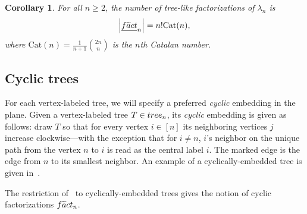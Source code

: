 \documentclass[a4paper,10pt,leqno]{amsart}
\newcommand{\darkred}{\color{darkred}}
\numberwithin{equation}{section}
\newtheorem{theorem}{Theorem}[section]
\newtheorem{corollary}[theorem]{Corollary}
\theoremstyle{definition}
\theoremstyle{remark}
\newcommand{\T}{\textsc{tree}}
\newcommand{\Ft}{\textsc{f}\widetilde{\textsc{a}}\textsc{ct}}
\newcommand{\E}{\T}
\newcommand{\EFt}{\underline{\Ft}}
\newcommand{\rrT}{\rr^T}
\newcommand{\rr}{\mathsf{r}}
\newcommand{\Trr}{T^\rr}
\newcommand{\Cat}{\mathrm{Cat}}
\newcommand{\defn}[1]{\emph{\darkred #1}}
\begin{document}
{
\renewcommand{\thecorollary}{\ref{cor:tree_like_enumeration}}
\begin{corollary}
For all $n\geq 2$, the number of tree-like factorizations of $\lambda_n$ is
\[\left|\EFt_n\right| = n! \Cat(n),\] where $\Cat(n) = \frac{1}{n+1}\binom{2n}{n}$ is the $n$th \defn{Catalan number}.
\end{corollary}
\addtocounter{theorem}{-1}
}


\subsection{Cyclic trees}

For each vertex-labeled tree, we will specify a preferred \emph{cyclic} embedding in the plane.  
Given a vertex-labeled tree $T \in \T_n$, its \defn{cyclic} embedding is given as follows: draw $T$ so that for every vertex $i \in [n]$ its neighboring vertices $j$ increase clockwise---with the exception that for $i\neq n$, $i$'s neighbor on the unique path from the vertex $n$ to $i$ is read as the central label $i$.  The marked edge is the edge from $n$ to its smallest neighbor.  An example of a cyclically-embedded tree is given in~.

The restriction of~ to cyclically-embedded trees gives the notion of cyclic factorizations $\Ft_n$.

\end{document}
